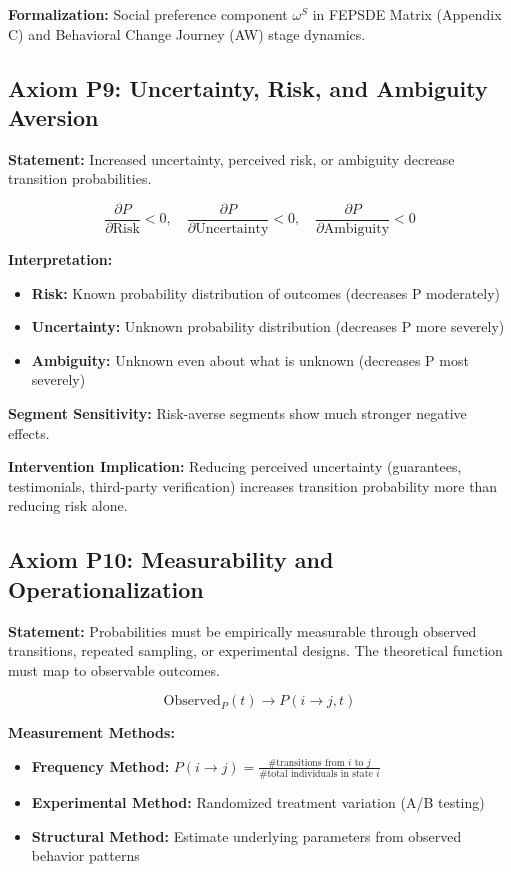 \documentclass[11pt, a4paper]{article}
\begin{document}
\textbf{Formalization:} Social preference component $\omega^S$ in FEPSDE Matrix (Appendix C) and Behavioral Change Journey (AW) stage dynamics.

\subsection{Axiom P9: Uncertainty, Risk, and Ambiguity Aversion}

\textbf{Statement:} Increased uncertainty, perceived risk, or ambiguity decrease transition probabilities.

\begin{equation}
\frac{\partial P}{\partial \text{Risk}} < 0, \quad \frac{\partial P}{\partial \text{Uncertainty}} < 0, \quad \frac{\partial P}{\partial \text{Ambiguity}} < 0
\end{equation}

\textbf{Interpretation:}
\begin{itemize}[nosep]
    \item \textbf{Risk:} Known probability distribution of outcomes (decreases P moderately)
    \item \textbf{Uncertainty:} Unknown probability distribution (decreases P more severely)
    \item \textbf{Ambiguity:} Unknown even about what is unknown (decreases P most severely)
\end{itemize}

\textbf{Segment Sensitivity:} Risk-averse segments show much stronger negative effects.

\textbf{Intervention Implication:} Reducing perceived uncertainty (guarantees, testimonials, third-party verification) increases transition probability more than reducing risk alone.

\subsection{Axiom P10: Measurability and Operationalization}

\textbf{Statement:} Probabilities must be empirically measurable through observed transitions, repeated sampling, or experimental designs. The theoretical function must map to observable outcomes.

\begin{equation}
\text{Observed}_P(t) \to P(i \to j, t)
\end{equation}

\textbf{Measurement Methods:}
\begin{itemize}[nosep]
    \item \textbf{Frequency Method:} $P(i \to j) = \frac{\text{\# transitions from } i \text{ to } j}{\text{\# total individuals in state } i}$
    \item \textbf{Experimental Method:} Randomized treatment variation (A/B testing)
    \item \textbf{Structural Method:} Estimate underlying parameters from observed behavior patterns
\end{itemize}
\end{document}
